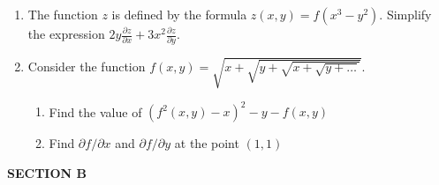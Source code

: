 \documentclass[12pt]{article} %
\theoremstyle{definition} %
\begin{document}
\begin{enumerate}
\item The function $z$ is defined by the formula $z(x,y)=f(x^3-y^2)$. Simplify the expression $2y\frac{\partial z}{\partial x}+3x^2\frac{\partial z}{\partial y}$.

\item Consider the function $f(x,y)=\sqrt{x+\sqrt{y+\sqrt{x+\sqrt{y + \ldots }}}}$.
\begin{enumerate}
\item Find the value of $(f^2(x,y)-x)^2-y-f(x,y)$
\item Find $\partial f/\partial x$ and $\partial f/\partial y$ at the point $(1,1)$
\end{enumerate}





\end{enumerate}

\textbf{SECTION B}
\end{document}
